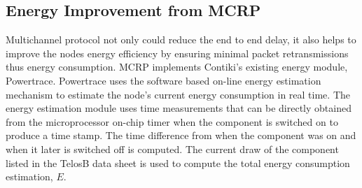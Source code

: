 \subsection{Energy Improvement from MCRP}


Multichannel protocol not only could reduce the end to end delay, it also helps to improve the nodes energy efficiency by ensuring minimal packet retransmissions thus energy consumption.
MCRP implements Contiki's existing energy module, Powertrace.
Powertrace uses the software based on-line energy estimation mechanism \cite{dunkels2007software} to estimate the node's current energy consumption in real time. 
The energy estimation module uses time measurements that can be directly obtained from the microprocessor on-chip timer when the component is switched on to produce a time stamp. The time difference from when the component was on and when it later is switched off is computed. The current draw of the component listed in the TelosB data sheet is used to compute the total energy consumption estimation, $E$. 

